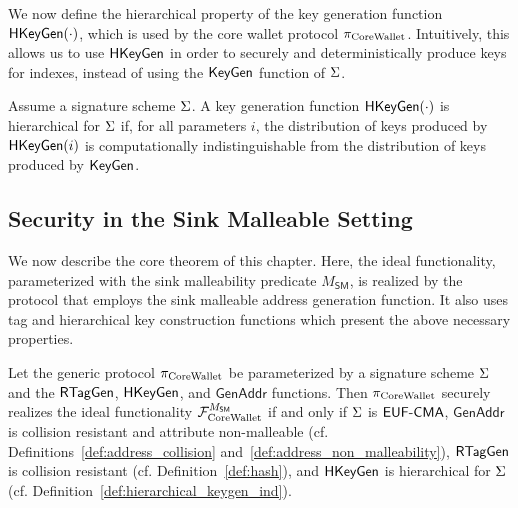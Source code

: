 We now define the hierarchical property of the key generation function
$\mathsf{HKeyGen}(\cdot)$, which is used by the core wallet protocol $\pi_\mathrm{CoreWallet}$.
Intuitively, this allows us to use $\mathsf{HKeyGen}$ in order to
securely and deterministically produce keys for indexes, instead of using the
$\mathsf{KeyGen}$ function of $\Sigma$.

\begin{definition}\label{def:hierarchical_keygen_ind}
    Assume a signature scheme $\Sigma$. A key
    generation function $\mathsf{HKeyGen}(\cdot)$ is hierarchical for
    $\Sigma$ if, for all parameters $i$, the distribution of keys produced
    by $\mathsf{HKeyGen}(i)$ is computationally
    indistinguishable from the distribution
    of keys produced by $\mathsf{KeyGen}$.
\end{definition}

\subsection{Security in the Sink Malleable Setting}

We now describe the core theorem of this chapter. Here, the ideal
functionality, parameterized with the sink malleability predicate
$M_{\mathsf{SM}}$, is realized by the protocol that employs the sink
malleable address generation function. It also uses tag and hierarchical key
construction functions which present the above necessary properties.

\begin{theorem}\label{thm:sec_sink_malleable}
    Let the generic protocol $\pi_\mathrm{CoreWallet}$ be parameterized by a signature scheme
    $\Sigma$
    and the $\mathsf{RTagGen}$, $\mathsf{HKeyGen}$, and
    $\mathsf{GenAddr}$ functions. Then $\pi_\mathrm{CoreWallet}$ securely realizes the ideal
    functionality $\mathcal{F}_\mathrm{CoreWallet}^{M_{\mathsf{SM}}}$ if and only if $\Sigma$ is
    $\textsf{EUF-CMA}$, $\mathsf{GenAddr}$ is collision resistant and attribute
    non-malleable (cf. Definitions~\ref{def:address_collision}
    and~\ref{def:address_non_malleability}), $\mathsf{RTagGen}$ is collision
    resistant (cf. Definition~\ref{def:hash}), and $\mathsf{HKeyGen}$ is
    hierarchical for $\Sigma$ (cf.
    Definition~\ref{def:hierarchical_keygen_ind}).
\end{theorem}

